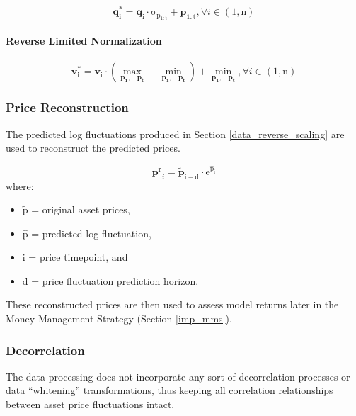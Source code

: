 \documentclass[a4paper,11pt,oneside]{article}
\theoremstyle{plain}
\theoremstyle{definition}
\begin{document}
	\begin{equation}
	\mathbf{q^{*}_i} = \mathrm{{\mathbf{q}_i} \cdot \sigma_{p_{1:t}} + \bar{\mathbf{p}}_{1:t}},  \forall  i \in (1, \mathrm{n})
	\end{equation}
	
	\paragraph{Reverse Limited Normalization}
	
	\begin{equation}
	\mathbf{v^{*}_i} = \mathrm{\mathbf{v}_i \cdot \left(\max\limits_{\mathbf{p_1},\dots\mathbf{p_t}} - \min\limits_{\mathbf{p_1},\dots\mathbf{p_t}}\right) + \min\limits_{\mathbf{p_1},\dots\mathbf{p_t}}},  \forall  i \in (1, \mathrm{n})
	\end{equation}
	
	
	\subsubsection{Price Reconstruction}\label{data_price_recon}
	
	The predicted log fluctuations produced in Section \ref{data_reverse_scaling} are used to reconstruct the predicted prices. 
	
	\begin{equation}\label{eq_price_recon}
	\mathbf{p^r}_{i} = \mathrm{\tilde{\mathbf{p}}_{i-d} \cdot e^{\hat{p}_{i}}}
	\end{equation}
	where:
	\begin{itemize}
		\item [] $\mathrm{\tilde{p}}$ = original asset prices,
		\item [] $\mathrm{\hat{p}}$ = predicted log fluctuation,
		\item [] $\mathrm{i}$ = price timepoint, and 
		\item [] $\mathrm{d}$ = price fluctuation prediction horizon.
		
	\end{itemize}
	\texttt{}\newline
	These reconstructed prices are then used to assess model returns later in the Money Management Strategy (Section \ref{imp_mms}).
	
	\subsubsection{Decorrelation}
	
	The data processing does not incorporate any sort of decorrelation processes or data ``whitening'' transformations, thus keeping all correlation relationships between asset price fluctuations intact.
	
\end{document}
